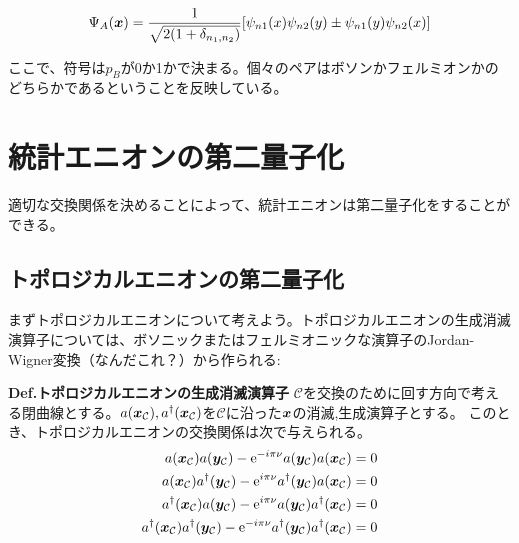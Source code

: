\documentclass[a4paper,11pt]{jsarticle}
\numberwithin{equation}{section}
\begin{document}
\begin{align}
  \Psi_A(\vb*{x})=\frac{1}{\sqrt{2(1+\delta_{n_1,n_2})}}[\psi_{n1}(x)\psi_{n2}(y)\pm \psi_{n1}(y)\psi_{n2}(x)]
\end{align}

ここで、符号は$p_B$が0か1かで決まる。個々のペアはボソンかフェルミオンかのどちらかであるということを反映している。

\section{統計エニオンの第二量子化}
適切な交換関係を決めることによって、統計エニオンは第二量子化をすることができる。

\subsection{トポロジカルエニオンの第二量子化}
まずトポロジカルエニオンについて考えよう。トポロジカルエニオンの生成消滅演算子については、ボソニックまたはフェルミオニックな演算子のJordan-Wigner変換（なんだこれ？）から作られる:
\\

\begin{itembox}[l]{\textbf{Def.トポロジカルエニオンの生成消滅演算子 }}
$\mathcal{C}$を交換のために回す方向で考える閉曲線とする。$a(\vb*{x}_\mathcal{C}),a^{\dag}(\vb*{x}_\mathcal{C})$を$\mathcal{C}$に沿った$\vb*{x}$の消滅,生成演算子とする。
このとき、トポロジカルエニオンの交換関係は次で与えられる。
\begin{align}
a(\vb*{x}_\mathcal{C})a(\vb*{y}_\mathcal{C})-\mathrm{e}^{-i\pi\nu}a(\vb*{y}_\mathcal{C})a(\vb*{x}_\mathcal{C})=0\\
a(\vb*{x}_\mathcal{C})a^{\dag}(\vb*{y}_\mathcal{C})-\mathrm{e}^{i\pi\nu}a^{\dag}(\vb*{y}_\mathcal{C})a(\vb*{x}_\mathcal{C})=0\\
a^{\dag}(\vb*{x}_\mathcal{C})a(\vb*{y}_\mathcal{C})-\mathrm{e}^{i\pi\nu}a(\vb*{y}_\mathcal{C})a^{\dag}(\vb*{x}_\mathcal{C})=0\\
a^{\dag}(\vb*{x}_\mathcal{C})a^{\dag}(\vb*{y}_\mathcal{C})-\mathrm{e}^{-i\pi\nu}a^{\dag}(\vb*{y}_\mathcal{C})a^{\dag}(\vb*{x}_\mathcal{C})=0
\end{align}
\end{itembox}
\end{document}
